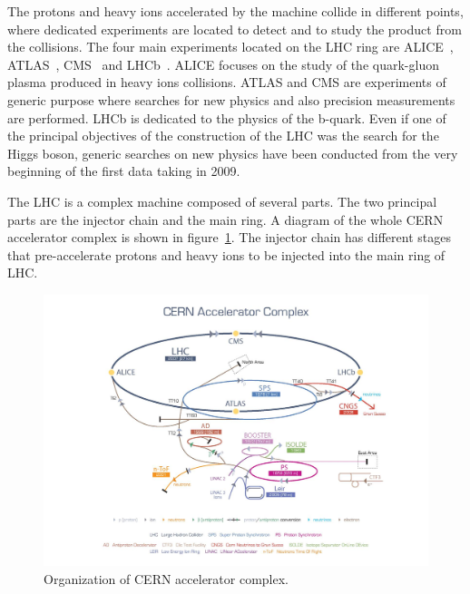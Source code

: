 The protons and heavy ions accelerated by the machine collide in different points, where dedicated experiments are located to detect and to study the product from the collisions. The four main experiments located on the LHC ring are ALICE~\cite{Cortese:879894}, ATLAS~\cite{ATLAS:1999}, CMS~\cite{Bayatian:922757} and LHCb~\cite{Alves:2008zz}. ALICE focuses on the study of the quark-gluon plasma produced in heavy ions collisions. ATLAS and CMS are experiments of generic purpose where searches for new physics and also precision measurements are performed. LHCb is dedicated to the physics of the b-quark. Even if one of the principal objectives of the construction of the LHC was the search for the Higgs boson, generic searches on new physics have been conducted from the very beginning of the first data taking in 2009. %

The LHC is a complex machine composed of several parts. The two principal parts are the injector chain and the main ring. A diagram of the whole CERN accelerator complex is shown in figure~\ref{fig:Complex}. The injector chain has different stages that pre-accelerate protons and heavy ions to be injected into the main ring of LHC. %

\begin{figure}[!Hhtbp]
  \begin{center}
    \includegraphics[trim=4.5cm 0cm 0cm 0cm, clip=true, width=1.15\textwidth]{figs/cern-lhc-4.jpg}
    \caption{Organization of CERN accelerator complex.}
    \label{fig:Complex}
  \end{center}
\end{figure}

